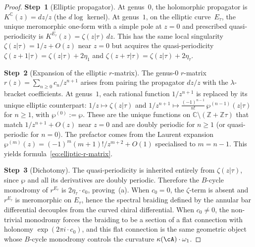 \begin{proof}
\textbf{Step~1} (Elliptic propagator).
At genus~$0$, the holomorphic propagator is
$K^{\mathbb{C}}(z)=dz/z$ (the $d\log$ kernel). At
genus~$1$, on the elliptic curve~$E_\tau$, the unique meromorphic
one-form with a simple pole at $z=0$ and prescribed quasi-periodicity
is $K^{E_\tau}(z)=\zeta(z|\tau)\,dz$. This has the same local
singularity $\zeta(z|\tau)=1/z+O(z)$ near $z=0$ but acquires
the quasi-periodicity
$\zeta(z+1|\tau)=\zeta(z|\tau)+2\eta_1$ and
$\zeta(z+\tau|\tau)=\zeta(z|\tau)+2\eta_\tau$.

\textbf{Step~2} (Expansion of the elliptic $r$-matrix).
The genus-$0$ $r$-matrix $r(z)=\sum_{n\ge 0}c_n/z^{n+1}$
arises from pairing the propagator $dz/z$ with the
$\lambda$-bracket coefficients. At genus~$1$, each
rational function $1/z^{n+1}$ is replaced by its unique
elliptic counterpart: $1/z\mapsto\zeta(z|\tau)$ and
$1/z^{n+1}\mapsto\frac{(-1)^{n-1}}{n!}\,\wp^{(n-1)}(z|\tau)$
for $n\ge 1$, with $\wp^{(0)}:=\wp$. These are the unique
functions on $\mathbb{C}\setminus(\mathbb{Z}+\mathbb{Z}\tau)$
that match $1/z^{n+1}+O(z)$ near $z=0$ and are doubly
periodic for $n\ge 1$ (or quasi-periodic for $n=0$). The
prefactor comes from the Laurent expansion
$\wp^{(m)}(z)=(-1)^m(m+1)!/z^{m+2}+O(1)$ specialised to
$m=n-1$. This yields formula~\eqref{eq:elliptic-r-matrix}.

\textbf{Step~3} (Dichotomy).
The quasi-periodicity is inherited entirely from $\zeta(z|\tau)$,
since $\wp$ and all its derivatives are doubly periodic.
Therefore the $B$-cycle monodromy of $r^{E_\tau}$ is
$2\eta_\tau\cdot c_0$, proving~(a). When $c_0=0$, the
$\zeta$-term is absent and $r^{E_\tau}$ is meromorphic on
$E_\tau$, hence the spectral braiding defined by the annular bar
differential decouples from the curved chiral differential. When
$c_0\ne 0$, the non-trivial monodromy
forces the braiding to be a section of a flat connection with
holonomy $\exp(2\pi i\cdot c_0)$, and this flat connection
is the same geometric object whose $B$-cycle monodromy
controls the curvature $\kappa(\cA)\cdot\omega_1$.
\end{proof}


